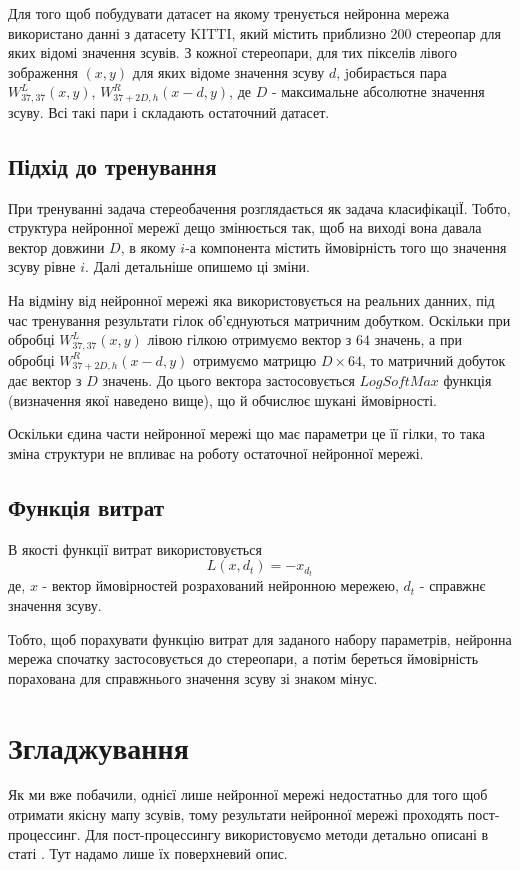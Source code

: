 \documentclass[11pt]{article}
\theoremstyle{definition}
\begin{document}
Для того щоб побудувати датасет на якому тренується нейронна мережа використано данні з датасету KITTI, який містить приблизно 200 стереопар для яких відомі значення зсувів. З кожної стереопари, для тих пікселів лівого зображення $(x, y)$ для яких відоме значення зсуву $d$, jобирається пара $W^L_{37,37}(x,y)$, $W^R_{37 + 2D,h}(x - d,y)$, де $D$ - максимальне абсолютне значення зсуву. Всі такі пари і складають остаточний датасет.

\subsection{Підхід до тренування}
При тренуванні задача стереобачення розглядається як задача класифікаціЇ. Тобто, структура нейронної мережї дещо змінюється так, щоб на виході вона давала вектор довжини $D$, в якому $i$-а компонента містить ймовірність того що значення зсуву рівне $i$. Далі детальніше опишемо ці зміни.
  
На відміну від нейронної мережі яка використовується на реальних данних, під час тренування результати гілок об'єднуються матричним добутком. Оскільки при обробці $W^L_{37,37}(x,y)$ лівою гілкою отримуємо вектор з $64$ значень, а при обробці $W^R_{37 + 2D,h}(x - d,y)$  отримуємо матрицю $D \times 64$, то матричний добуток дає вектор з $D$ значень. До цього вектора застосовується $LogSoftMax$ функція (визначення якої наведено вище), що й обчислює шукані ймовірності.

Оскільки єдина части нейронної мережі що має параметри це її гілки, то така зміна структури не впливає на роботу остаточної нейронної мережі.

\subsection{Функція витрат}
В якості функції витрат використовується
\[ L(x, d_t) = -x_{d_t} \]
де, $x$ - вектор ймовірностей розрахований нейронною мережею, $d_t$ - справжнє значення зсуву.

Тобто, щоб порахувати функцію витрат для заданого набору параметрів, нейронна мережа спочатку застосовується до стереопари, а потім береться ймовірність порахована для справжнього значення зсуву зі знаком мінус.

\section{Згладжування}
Як ми вже побачили, однієї лише нейронної мережі недостатньо для того щоб отримати якісну мапу зсувів, тому результати нейронної мережі проходять пост-процессинг. Для пост-процессингу використовуємо методи детально описані в статі \cite{zbontar2016stereo}. Тут надамо лише їх поверхневий опис.
\end{document}
